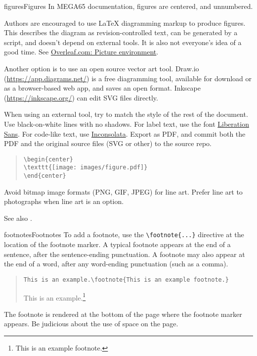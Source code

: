 \begin{sgentry}{figures}{Figures}
    In MEGA65 documentation, figures are centered, and unnumbered.

    Authors are encouraged to use LaTeX diagramming markup to produce figures. This describes the diagram as revision-controlled text, can be generated by a script, and doesn't depend on external tools. It is also not everyone's idea of a good time. See \href{https://www.overleaf.com/learn/latex/Picture_environment}{Overleaf.com: Picture environment}.

    Another option is to use an open source vector art tool. Draw.io (\url{https://app.diagrams.net/}) is a free diagramming tool, available for download or as a browser-based web app, and saves an open format. Inkscape (\url{https://inkscape.org/}) can edit SVG files directly.

    When using an external tool, try to match the style of the rest of the document. Use black-on-white lines with no shadows. For label text, use the font \href{https://en.wikipedia.org/wiki/Liberation_fonts}{Liberation Sans}. For code-like text, use \href{https://fonts.google.com/specimen/Inconsolata}{Inconsolata}. Export as PDF, and commit both the PDF and the original source files (SVG or other) to the source repo.

    \begin{quote}
\begin{verbatim}
\begin{center}
\texttt{[image: images/figure.pdf]}
\end{center}
\end{verbatim}
    \end{quote}

    Avoid bitmap image formats (PNG, GIF, JPEG) for line art. Prefer line art to photographs when line art is an option.

    See also .
\end{sgentry}

\begin{sgentry}{footnotes}{Footnotes}
    To add a footnote, use the \texttt{{\textbackslash}footnote\{...\}} directive at the location of the footnote marker. A typical footnote appears at the end of a sentence, after the sentence-ending punctuation. A footnote may also appear at the end of a word, after any word-ending punctuation (such as a comma).

    \begin{quote}
        \texttt{This is an example.{\textbackslash}footnote\{This is an example footnote.\}}

        \hrulefill

        This is an example.\footnote{This is an example footnote.}
    \end{quote}

    The footnote is rendered at the bottom of the page where the footnote marker appears. Be judicious about the use of space on the page.
\end{sgentry}

